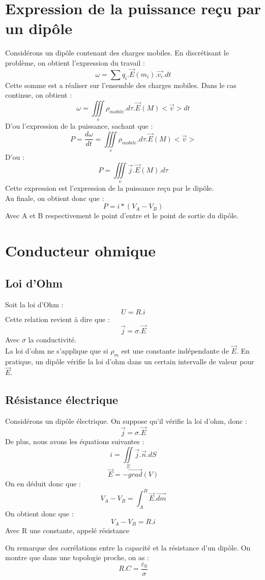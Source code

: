 \section{Expression de la puissance reçu par un dipôle}
Considérons un dipôle contenant des charges mobiles. En discrétisant le problème, on obtient l'expression du travail :
$$\omega = \sum q_i.\overrightarrow{E}(m_i).\overrightarrow{v_i}.dt$$
Cette somme est a réaliser sur l'ensemble des charges mobiles. Dans le cas continue, on obtient : 
$$\omega = \underset{v}\iiint \rho_{mobile}.d\tau.\overrightarrow{E}(M)<\overrightarrow{v}>dt$$
D'ou l'expression de la puissance, sachant que : 
$$P = \dfrac{d\omega}{dt} = \underset{v}\iiint \rho_{mobile}.d\tau.\overrightarrow{E}(M)<\overrightarrow{v}>$$
D'ou : 
$$P = \underset{v}\iiint \overrightarrow{j}.\overrightarrow{E}(M).d\tau$$
Cette expression est l'expression de la puissance reçu par le dipôle.\\
Au finale, on obtient donc que : 
$$P=i*(V_A-V_B)$$
Avec A et B respectivement le point d'entre et le point de sortie du dipôle.
\section{Conducteur ohmique}
\subsection{Loi d'Ohm}
Soit la loi d'Ohm : 
$$U = R.i$$
Cette relation revient à dire que : 
$$\overrightarrow{j} = \sigma.\overrightarrow{E}$$
Avec $\sigma$ la conductivité.\\
La loi d'ohm ne s'applique que si $\rho_m$ est une constante indépendante de $\overrightarrow{E}$. En pratique, un dipôle vérifie la loi d'ohm dans un certain intervalle de valeur pour $\overrightarrow{E}$.
\subsection{Résistance électrique}
\begin{de}
Considérons un dipôle électrique. On suppose qu'il vérifie la loi d'ohm, donc : 
$$\overrightarrow{j}=\sigma.\overrightarrow{E}$$
De plus, nous avons les équations suivantes :
$$i = \underset{\Sigma}\iint \overrightarrow{j}.\overrightarrow{n}.dS$$
$$\overrightarrow{E} = -\overrightarrow{grad}(V)$$
On en déduit donc que : 
$$V_A - V_B = \int_A^B \overrightarrow{E}.\overrightarrow{dm}$$
On obtient donc que :
$$V_A - V_B = R.i$$
Avec R une constante, appelé résistance
\end{de}
\begin{prop}
On remarque des corrélations entre la capacité et la résistance d'un dipôle. On montre que dans une topologie proche, on as : 
$$R.C = \dfrac{\varepsilon_0}{\sigma}$$
\end{prop}
